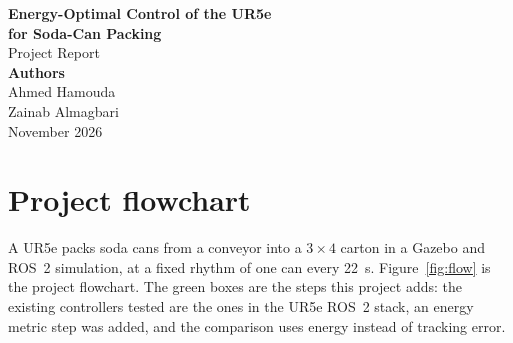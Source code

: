 \documentclass[12pt,a4paper]{article}
\begin{document}
\begin{titlepage}
\centering

\vspace*{4cm}
{\LARGE \textbf{Energy-Optimal Control of the UR5e\\[0.2cm] for Soda-Can Packing}}\\[0.6cm]
{\large Project Report}\\

\vspace{3cm}
{\Large \textbf{Authors}}\\[0.3cm]
{\large Ahmed Hamouda}\\[0.1cm]
{\large Zainab Almagbari}\\

\vfill
{\large November 2026}
\end{titlepage}

\section{Project flowchart}

A UR5e packs soda cans from a conveyor into a $3\times4$ carton in a Gazebo and ROS~2 simulation, at a fixed rhythm of one can every 22~s. Figure~\ref{fig:flow} is the project flowchart. The green boxes are the steps this project adds: the existing controllers tested are the ones in the UR5e ROS~2 stack, an energy metric step was added, and the comparison uses energy instead of tracking error.
\end{document}
